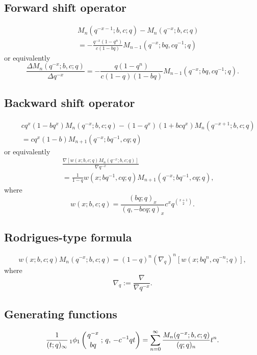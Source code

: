 \documentclass[envcountchap,graybox]{svmono}
\newcommand{\qhyp}[5]{\mbox{}_{#1}{\phi}_{#2}
\left(\genfrac{}{}{0pt}{}{#3}{#4}\,;\,q,\,#5\right)}
\begin{document}
\subsection*{Forward shift operator}
\begin{eqnarray}
\label{shift1qMeixnerI}
& &M_n(q^{-x-1};b,c;q)-M_n(q^{-x};b,c;q)\nonumber\\
& &{}=-\frac{q^{-x}(1-q^n)}{c(1-bq)}M_{n-1}(q^{-x};bq,cq^{-1};q)
\end{eqnarray}
or equivalently
\begin{equation}
\label{shift1qMeixnerII}
\frac{\Delta M_n(q^{-x};b,c;q)}{\Delta q^{-x}}
=-\frac{q(1-q^n)}{c(1-q)(1-bq)}M_{n-1}(q^{-x};bq,cq^{-1};q).
\end{equation}

\subsection*{Backward shift operator}
\begin{eqnarray}
\label{shift2qMeixnerI}
& &cq^x(1-bq^x)M_n(q^{-x};b,c;q)-(1-q^x)(1+bcq^x)M_n(q^{-x+1};b,c;q)\nonumber\\
& &{}=cq^x(1-b)M_{n+1}(q^{-x};bq^{-1},cq;q)
\end{eqnarray}
or equivalently
\begin{eqnarray}
\label{shift2qMeixnerII}
& &\frac{\nabla\left[w(x;b,c;q)M_n(q^{-x};b,c;q)\right]}{\nabla q^{-x}}\nonumber\\
& &{}=\frac{1}{1-q}w(x;bq^{-1},cq;q)M_{n+1}(q^{-x};bq^{-1},cq;q),
\end{eqnarray}
where
$$w(x;b,c;q)=\frac{(bq;q)_x}{(q,-bcq;q)_x}c^xq^{\binom{x+1}{2}}.$$

\subsection*{Rodrigues-type formula}
\begin{equation}
\label{RodqMeixner}
w(x;b,c;q)M_n(q^{-x};b,c;q)=(1-q)^n\left(\nabla_q\right)^n\left[w(x;bq^n,cq^{-n};q)\right],
\end{equation}
where
$$\nabla_q:=\frac{\nabla}{\nabla q^{-x}}.$$

\subsection*{Generating functions}
\begin{equation}
\label{GenqMeixner1}
\frac{1}{(t;q)_{\infty}}\,\qhyp{1}{1}{q^{-x}}{bq}{-c^{-1}qt}
=\sum_{n=0}^{\infty}\frac{M_n(q^{-x};b,c;q)}{(q;q)_n}t^n.
\end{equation}
\end{document}
